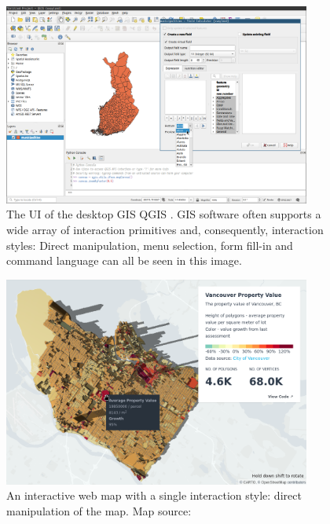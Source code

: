 \begin{figure}[H]
	\centering
	\includegraphics[width=0.9\textwidth]{visual/figures/screenshots/qgis_interface.png}
	\caption{
		The UI of the desktop GIS QGIS \parencite{qgis}.
		GIS software often supports a wide array of interaction primitives and,
		consequently, interaction styles:
		Direct manipulation, menu selection, form fill-in and command language
		can all be seen in this image.
	}
	\label{fig:qgis}
\end{figure}

\begin{figure}[H]
	\centering
	\includegraphics[width=0.9\textwidth]{visual/figures/screenshots/simple_web_map.png}
	\caption{
		An interactive web map with a single interaction style:
		direct manipulation of the map.
		Map source: \textcite{deckgl-ex}
	}
	\label{fig:simple web map}
\end{figure}



